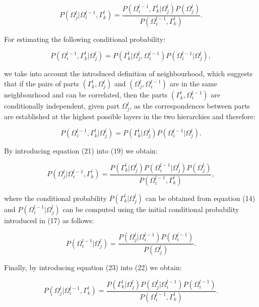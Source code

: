 \documentclass[runningheads]{llncs}
\begin{document}
\begin{equation}
 P(\Omega_j^{l} \vert \Omega_i^{l-1},\Gamma_k^l) = \frac{P(\Omega_i^{l-1},\Gamma_k^l \vert \Omega_j^{l})P(\Omega_j^{l})}{P(\Omega_i^{l-1},\Gamma_k^l)}.
\end{equation}

For estimating the following conditional probability:

\begin{equation}
 P(\Omega_i^{l-1},\Gamma_k^l \vert \Omega_j^{l}) =  P(\Gamma_k^l \vert \Omega_j^{l},\Omega_i^{l-1}) P(\Omega_i^{l-1} \vert \Omega_j^{l}),
\end{equation}

we take into account the introduced definition of neighbourhood, which suggests that if the pairs of parts $(\Gamma_k^l,\Omega_j^{l})$ and $(\Omega_j^{l},\Omega_i^{l-1})$ are in the same neighbourhood and can be correlated, then the parts $(\Gamma_k^l,\Omega_i^{l-1})$ are conditionally independent, given part $\Omega_j^{l}$, as the correspondences between parts are established at the highest possible layers in the two hierarchies and therefore: 

\begin{equation}
 P(\Omega_i^{l-1},\Gamma_k^l \vert \Omega_j^{l}) =  P(\Gamma_k^l \vert \Omega_j^{l}) P(\Omega_i^{l-1} \vert \Omega_j^{l}).
\end{equation}

By introducing equation (21) into (19) we obtain:

\begin{equation}
 P(\Omega_j^{l} \vert \Omega_i^{l-1},\Gamma_k^l) = \frac{P(\Gamma_k^l \vert \Omega_j^{l})P(\Omega_i^{l-1} \vert \Omega_j^{l})P(\Omega_j^{l})}{P(\Omega_i^{l-1},\Gamma_k^l)},
\end{equation}

where the conditional probability $P(\Gamma_k^l \vert \Omega_j^l)$ can be obtained from equation (14) and $P(\Omega_i^{l-1} \vert \Omega_j^{l})$ can be computed using the initial conditional probability introduced in (17) as follows:

\begin{equation}
 P(\Omega_i^{l-1} \vert \Omega_j^{l}) = \frac{P(\Omega_j^{l}\vert \Omega_i^{l-1})P(\Omega_i^{l-1})}{P(\Omega_j^{l})}.
 \end{equation}

Finally, by introducing equation (23) into (22) we obtain:

\begin{equation}
 P(\Omega_j^{l} \vert \Omega_i^{l-1},\Gamma_k^l) = \frac{P(\Gamma_k^l \vert \Omega_j^{l})P(\Omega_j^{l} \vert \Omega_i^{l-1})P(\Omega_i^{l-1})}{P(\Omega_i^{l-1},\Gamma_k^l)}.
\end{equation}
  
\end{document}
